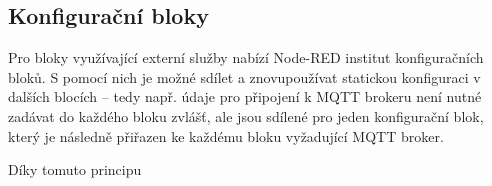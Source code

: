 \subsection{Konfigurační bloky}
Pro bloky využívající externí služby nabízí Node-RED institut konfiguračních bloků. S pomocí nich je možné sdílet a
znovupoužívat statickou konfiguraci v dalších blocích -- tedy např. údaje pro připojení k MQTT brokeru není nutné zadávat
do každého bloku zvlášť, ale jsou sdílené pro jeden konfigurační blok, který je následně přiřazen ke každému bloku vyžadující
MQTT broker.

Díky tomuto principu



